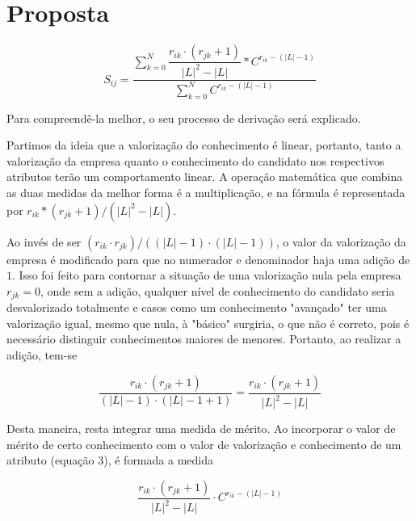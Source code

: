 \documentclass[]{article}
\begin{document}
	\section{Proposta}
	
	\begin{center}
		\begin{equation}
			S_{ij} = \dfrac{\sum_{k = 0}^N \dfrac{r_{ik}\cdot(r_{jk} + 1)}{|L|^2 - |L|} * C^{r_{ik} - (|L| - 1)}}{\sum_{k = 0}^N C^{r_{ik} - (|L| - 1)}}
		\end{equation}	
	\end{center}
	
	Para compreendê-la melhor, o seu processo de derivação será explicado.
	
	Partimos da ideia que a valorização do conhecimento é linear, portanto, tanto a valorização da empresa quanto o conhecimento do candidato nos respectivos atributos terão um comportamento linear. A operação matemática que combina as duas medidas da melhor forma é a multiplicação, e na fórmula é representada por $ r_{ik}*(r_{jk} + 1)/ (|L|^2 - |L|) $. 
	
	Ao invés de ser $ (r_{ik}\cdot r_{jk})/((|L| - 1)\cdot(|L| - 1)) $, o valor da valorização da empresa é modificado para que no numerador e denominador haja uma adição de $1$. Isso foi feito para contornar a situação de uma valorização nula pela empresa $r_{jk} = 0$, onde sem a adição, qualquer nível de conhecimento do candidato seria desvalorizado totalmente e casos como um conhecimento "avançado" ter uma valorização igual, mesmo que nula, à "básico" surgiria, o que não é correto, pois é necessário distinguir conhecimentos maiores de menores. Portanto, ao realizar a adição, tem-se
	
	\begin{center}
		\begin{equation}
			\dfrac{r_{ik}\cdot(r_{jk} + 1)}{(|L| - 1)\cdot(|L| - 1 + 1)} = \dfrac{r_{ik}\cdot(r_{jk} + 1)}{|L|^2 - |L|}
		\end{equation}	
	\end{center}
	
	Desta maneira, resta integrar uma medida de mérito. Ao incorporar o valor de mérito de certo conhecimento com o valor de valorização e conhecimento de um atributo (equação 3), é formada a medida
	
	
	\begin{center}
		\begin{equation}
			\dfrac{r_{ik}\cdot(r_{jk} + 1)}{|L|^2 - |L|} \cdot C^{r_{ik} - (|L| - 1)}
		\end{equation}
	\end{center}
	
\end{document}
